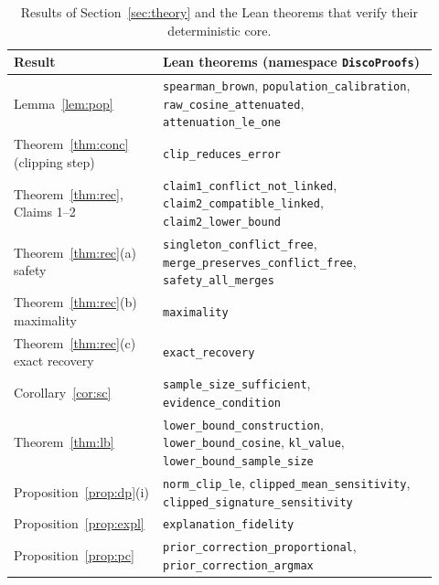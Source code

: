 \begin{table}[h]
\centering
\caption{Results of Section~\ref{sec:theory} and the Lean theorems that verify their deterministic core.}\label{tab:lean}
\small
\begin{tabular}{p{0.3\linewidth}p{0.62\linewidth}}
\toprule
Result & Lean theorems (namespace \texttt{DiscoProofs}) \\
\midrule
Lemma~\ref{lem:pop} & \texttt{spearman\_brown}, \texttt{population\_calibration}, \texttt{raw\_cosine\_attenuated}, \texttt{attenuation\_le\_one} \\
Theorem~\ref{thm:conc} (clipping step) & \texttt{clip\_reduces\_error} \\
Theorem~\ref{thm:rec}, Claims 1--2 & \texttt{claim1\_conflict\_not\_linked}, \texttt{claim2\_compatible\_linked}, \texttt{claim2\_lower\_bound} \\
Theorem~\ref{thm:rec}(a) safety & \texttt{singleton\_conflict\_free}, \texttt{merge\_preserves\_conflict\_free}, \texttt{safety\_all\_merges} \\
Theorem~\ref{thm:rec}(b) maximality & \texttt{maximality} \\
Theorem~\ref{thm:rec}(c) exact recovery & \texttt{exact\_recovery} \\
Corollary~\ref{cor:sc} & \texttt{sample\_size\_sufficient}, \texttt{evidence\_condition} \\
Theorem~\ref{thm:lb} & \texttt{lower\_bound\_construction}, \texttt{lower\_bound\_cosine}, \texttt{kl\_value}, \texttt{lower\_bound\_sample\_size} \\
Proposition~\ref{prop:dp}(i) & \texttt{norm\_clip\_le}, \texttt{clipped\_mean\_sensitivity}, \texttt{clipped\_signature\_sensitivity} \\
Proposition~\ref{prop:expl} & \texttt{explanation\_fidelity} \\
Proposition~\ref{prop:pc} & \texttt{prior\_correction\_proportional}, \texttt{prior\_correction\_argmax} \\
\bottomrule
\end{tabular}
\end{table}
